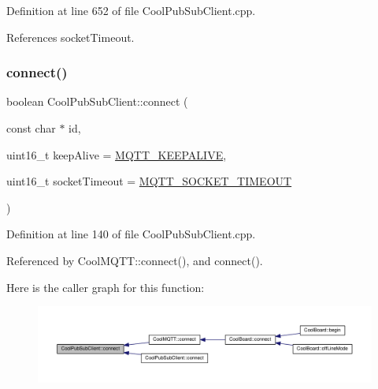 Definition at line 652 of file Cool\+Pub\+Sub\+Client.\+cpp.



References socket\+Timeout.

\mbox{\label{class_cool_pub_sub_client_a2664c2ebc302b2fa49f493a339ecc891}} 
\subsubsection{\texorpdfstring{connect()}{connect()}\hspace{0.1cm}{\footnotesize\ttfamily [1/4]}}
{\footnotesize\ttfamily boolean Cool\+Pub\+Sub\+Client\+::connect (\begin{DoxyParamCaption}\item[{const char $\ast$}]{id,  }\item[{uint16\+\_\+t}]{keep\+Alive = {\ttfamily \hyperlink{_cool_pub_sub_client_8h_afb4dd8c75385ab30e659314df7c2c335}{M\+Q\+T\+T\+\_\+\+K\+E\+E\+P\+A\+L\+I\+VE}},  }\item[{uint16\+\_\+t}]{socket\+Timeout = {\ttfamily \hyperlink{_cool_pub_sub_client_8h_a092cc564e4d7f03fdab6137e30a7f05b}{M\+Q\+T\+T\+\_\+\+S\+O\+C\+K\+E\+T\+\_\+\+T\+I\+M\+E\+O\+UT}} }\end{DoxyParamCaption})}



Definition at line 140 of file Cool\+Pub\+Sub\+Client.\+cpp.



Referenced by Cool\+M\+Q\+T\+T\+::connect(), and connect().

Here is the caller graph for this function\+:
\nopagebreak
\begin{figure}[H]
\begin{center}
\leavevmode
\includegraphics[width=350pt]{d8/d4b/class_cool_pub_sub_client_a2664c2ebc302b2fa49f493a339ecc891_icgraph}
\end{center}
\end{figure}
\mbox{\label{class_cool_pub_sub_client_a7f30e39bf4ca5ea5fb9747c403639a03}} 
